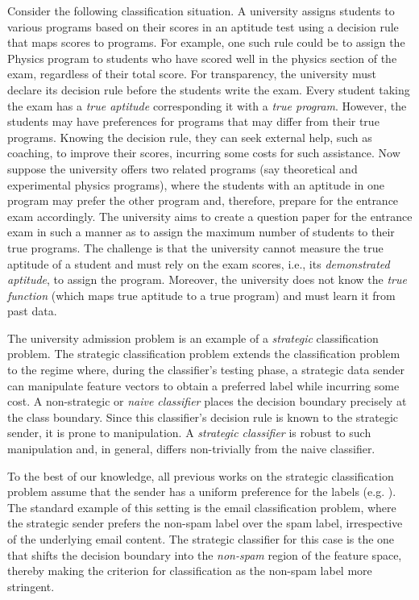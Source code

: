 Consider the following classification situation. A university assigns students to various programs based on their scores in an aptitude test using a decision rule that maps scores to programs. For example, one such rule could be to assign the Physics program to students who have scored well in the physics section of the exam, regardless of their total score. For transparency, the university must declare its decision rule before the students write the exam. Every student taking the exam has a \textit{true aptitude} corresponding it with a \textit{true program}.
However, the students may have preferences for programs that may differ from their true programs. Knowing the decision rule, they can seek external help, such as coaching, to improve their scores, incurring some costs for such assistance. 
Now suppose the university offers two related programs (say theoretical and experimental physics programs), where the students with an aptitude in one program may prefer the other program and, therefore, prepare for the entrance exam accordingly. The university aims to create a question paper for the entrance exam  in such a manner as to assign the maximum number of students to their true programs. The challenge is that the university cannot measure the true aptitude of a student and must rely on the exam scores, i.e., its \textit{demonstrated aptitude}, to assign the program. Moreover, the university does not know the \textit{true function} (which maps true aptitude to a true program) and must learn it from past data.

The university admission problem is an example of a \textit{strategic} classification problem. The strategic classification problem extends the classification problem to the regime where, during the classifier's testing phase, a strategic data sender can manipulate feature vectors to obtain a preferred label while incurring some cost. A non-strategic or \textit{naive classifier} places the decision boundary precisely at the class boundary. Since this classifier's decision rule is known to the strategic sender, it is prone to manipulation. A \textit{strategic classifier} is robust to such manipulation and, in general, differs non-trivially from the naive classifier.

To the best of our knowledge, all previous works on the strategic classification problem assume that the sender has a uniform preference for the labels (e.g. \cite{hardt2016strategic}). The standard example of this setting is the email classification problem, where the strategic sender prefers the non-spam label over the spam label, irrespective of the underlying email content. The strategic classifier for this case is the one that shifts the decision boundary into the \textit{non-spam} region of the feature space, thereby making the criterion for classification as the non-spam label more stringent.

